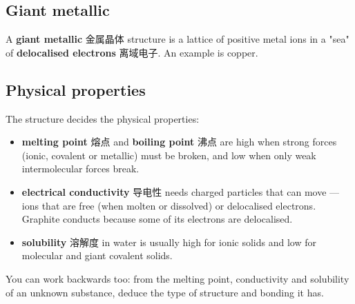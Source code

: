 \documentclass[11pt]{article}
\begin{document}
\subsection*{Giant metallic}

A \textbf{giant metallic} 金属晶体 structure is a lattice of positive metal ions in a "sea" of \textbf{delocalised electrons} 离域电子. An example is copper.

\subsection*{Physical properties}

The structure decides the physical properties:

\begin{center}
\end{center}

\begin{itemize}
\item \textbf{melting point} 熔点 and \textbf{boiling point} 沸点 are high when strong forces (ionic, covalent or metallic) must be broken, and low when only weak intermolecular forces break.

\item \textbf{electrical conductivity} 导电性 needs charged particles that can move — ions that are free (when molten or dissolved) or delocalised electrons. Graphite conducts because some of its electrons are delocalised.

\item \textbf{solubility} 溶解度 in water is usually high for ionic solids and low for molecular and giant covalent solids.

\end{itemize}

You can work backwards too: from the melting point, conductivity and solubility of an unknown substance, deduce the type of structure and bonding it has.
\end{document}
